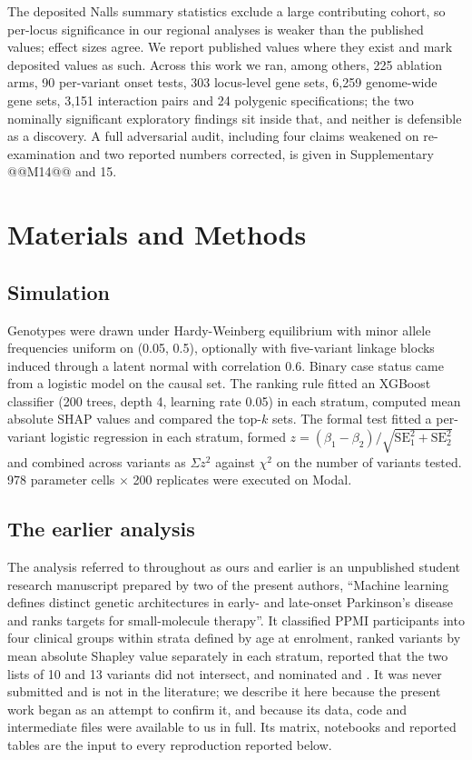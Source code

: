 \documentclass[10pt]{article}
\begin{document}
The deposited Nalls summary statistics exclude a large contributing cohort, so per-locus
significance in our regional analyses is weaker than the published values; effect sizes agree. We
report published values where they exist and mark deposited values as such. Across this work we
ran, among others, 225 ablation arms, 90 per-variant onset tests, 303 locus-level gene sets, 6,259
genome-wide gene sets, 3,151 interaction pairs and 24 polygenic specifications; the two nominally
significant exploratory findings sit inside that, and neither is defensible as a discovery. A full
adversarial audit, including four claims weakened on re-examination and two reported numbers
corrected, is given in Supplementary @@M14@@ and 15.

\section*{Materials and Methods}

\subsection*{Simulation}

Genotypes were drawn under Hardy-Weinberg equilibrium with minor allele frequencies uniform on
(0.05, 0.5), optionally with five-variant linkage blocks induced through a latent normal with
correlation 0.6. Binary case status came from a logistic model on the causal set. The ranking rule
fitted an XGBoost classifier (200 trees, depth 4, learning rate 0.05) in each stratum, computed
mean absolute SHAP values and compared the top-$k$ sets. The formal test fitted a per-variant
logistic regression in each stratum, formed $z = (\beta_1 - \beta_2)/\sqrt{\mathrm{SE}_1^2 +
\mathrm{SE}_2^2}$ and combined across variants as $\Sigma z^2$ against $\chi^2$ on the number of
variants tested. 978 parameter cells $\times$ 200 replicates were executed on Modal.

\subsection*{The earlier analysis}

The analysis referred to throughout as ours and earlier is an unpublished student research
manuscript prepared by two of the present authors, ``Machine learning defines distinct genetic
architectures in early- and late-onset Parkinson's disease and ranks targets for small-molecule
therapy''. It classified PPMI participants into four clinical groups within strata defined by age
at enrolment, ranked variants by mean absolute Shapley value separately in each stratum, reported
that the two lists of 10 and 13 variants did not intersect, and nominated  and
. It was never submitted and is not in the literature; we describe it here because the
present work began as an attempt to confirm it, and because its data, code and intermediate files
were available to us in full. Its matrix, notebooks and reported tables are the input to every
reproduction reported below.
\end{document}
